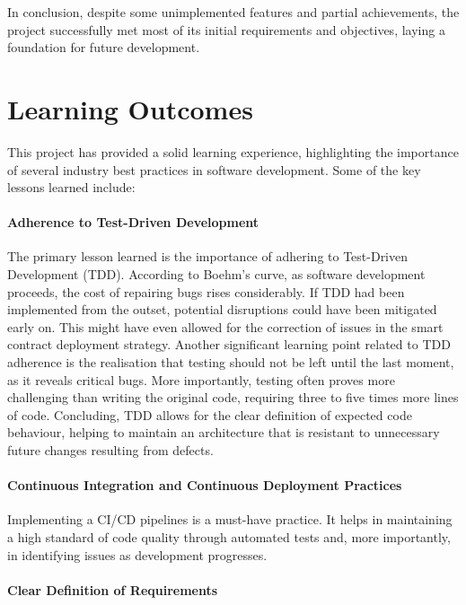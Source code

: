 In conclusion, despite some unimplemented features and partial achievements, the project successfully met most of its initial requirements and objectives, laying a foundation for future development.

\section{Learning Outcomes}

This project has provided a solid learning experience, highlighting the importance of several industry best practices in software development. Some of the key lessons learned include:

\paragraph{Adherence to Test-Driven Development}

The primary lesson learned is the importance of adhering to Test-Driven Development (TDD). According to Boehm's curve, as software development proceeds, the cost of repairing bugs rises considerably. If TDD had been implemented from the outset, potential disruptions could have been mitigated early on. This might have even allowed for the correction of issues in the smart contract deployment strategy. Another significant learning point related to TDD adherence is the realisation that testing should not be left until the last moment, as it reveals critical bugs. More importantly, testing often proves more challenging than writing the original code, requiring three to five times more lines of code. Concluding, TDD allows for the clear definition of expected code behaviour, helping to maintain an architecture that is resistant to unnecessary future changes resulting from defects.

\paragraph{Continuous Integration and Continuous Deployment Practices}

Implementing a CI/CD pipelines is a must-have practice. It helps in maintaining a high standard of code quality through automated tests and, more importantly, in identifying issues as development progresses. 

\paragraph{Clear Definition of Requirements}

